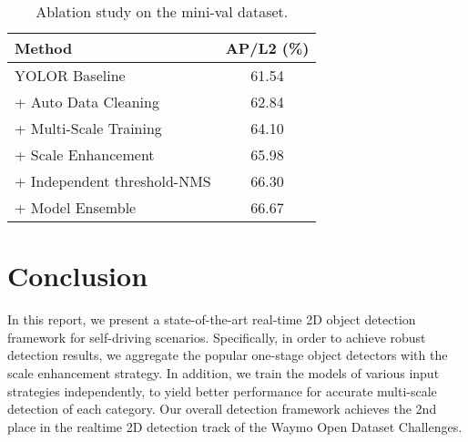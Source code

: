 \documentclass[final]{cvpr}
\begin{document}
\begin{table}[h]
\begin{center}
\caption{Ablation study on the mini-val dataset.}
\begin{tabular}{l|c}
\hline
Method  & AP/L2 (\%) \\
\hline
YOLOR Baseline & 61.54 \\
+ Auto Data Cleaning & 62.84\\
+ Multi-Scale Training & 64.10 \\
+ Scale Enhancement & 65.98 \\
+ Independent threshold-NMS & 66.30 \\
+ Model Ensemble & 66.67  \\
\hline
\end{tabular}
\label{ablation}
\end{center}
\end{table}




\section{Conclusion}

In this report, we present a state-of-the-art real-time 2D object detection framework for self-driving scenarios. Specifically, in order to achieve robust detection results, we aggregate the popular one-stage object detectors with the scale enhancement strategy. In addition, we train the models of various input strategies independently, to yield better performance for accurate multi-scale detection of each category. Our overall detection framework achieves the 2nd place in the realtime 2D detection track of the Waymo Open Dataset Challenges.
 
{\small


}
\end{document}
